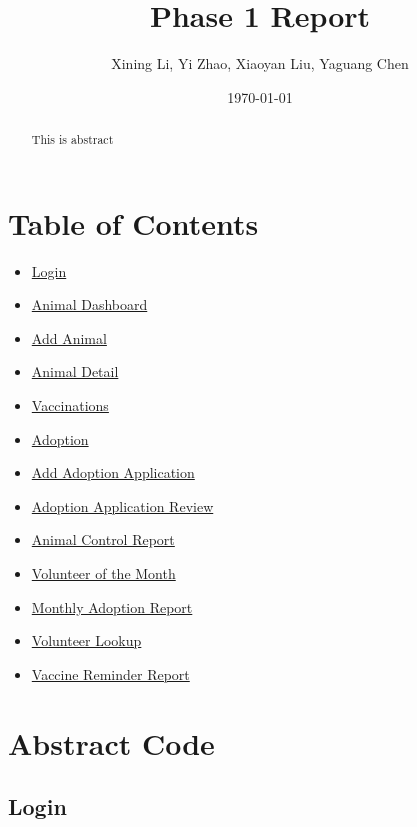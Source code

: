 \documentclass[a4paper]{article}
\begin{document}
\title{\textbf{\huge{Phase 1 Report}}}
\author{\textbf\large{Xining Li, Yi Zhao, Xiaoyan Liu, Yaguang Chen}}
\date{\today}
\maketitle
\begin{abstract}
This is abstract
\end{abstract}\maketitle
\section{Table of Contents}

	\begin{itemize}
		\item \hyperlink{login}{Login}
		\item \hyperlink{animal_dashboard}{Animal Dashboard}
		\item \hyperlink{add_animal}{Add Animal}
		\item \hyperlink{animal_detail}{Animal Detail}
		\item \hyperlink{vaccinations}{Vaccinations}
		\item \hyperlink{adoption}{Adoption}
		\item \hyperlink{add_adoption_app}{Add Adoption Application}
		\item \hyperlink{adoption_app_review}{Adoption Application Review}
		\item \hyperlink{animal_control_report}{Animal Control Report}
		\item \hyperlink{volunteer_of_the_month}{Volunteer of the Month}
		\item \hyperlink{monthly_adoption_report}{Monthly Adoption Report}
		\item \hyperlink{volunteer_lookup}{Volunteer Lookup}
		\item \hyperlink{vaccine_reminder_report}{Vaccine Reminder Report}
	\end{itemize}


\pagebreak

\section{Abstract Code}
\hypertarget{login}{\subsection{Login}}
\end{document}
